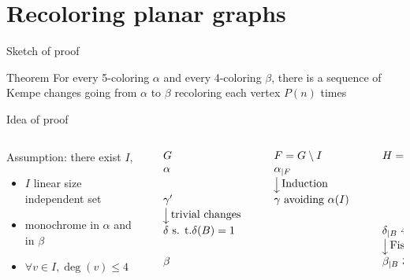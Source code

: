 \documentclass[11pt,xcolor=dvipsnames,presentation,aspectratio=169]{beamer}
\begin{document}
\section*{Recoloring planar graphs}
\begin{frame}{Sketch of proof}
  \begin{block}{Theorem}
    For every 5-coloring $\alpha$ and every 4-coloring $\beta$, there is a
    sequence of Kempe changes going from $\alpha$ to $\beta$ recoloring each
    vertex $P(n)$ times
  \end{block}

  \begin{block}{Idea of proof}
    \vspace{-.5cm}
    \begin{columns}
      \hfill
      \begin{column}{.35\textwidth}
        Assumption: there exist $I$,
        \begin{itemize}
        \item $I$ linear size independent set
        \item monochrome in $\alpha$ and in $\beta$
        \item $\forall v \in I, \deg(v) \le 4$
        \end{itemize}
        \vspace{1.5cm}
      \end{column}
      \hfill
      \begin{column}{.65\textwidth}
        $$\begin{array}{lllll}
          G && F = G \setminus I && H = G \setminus B\\
          \alpha &\quad& \alpha_{|F}&\quad& \\
          && \rotatebox[origin=c]{-90}{$\longrightarrow$} \text{ Induction} && \\
          \gamma' && \gamma \text{ avoiding } \alpha(I) &&\\
          \rotatebox[origin=c]{-90}{$\longrightarrow$} \text{ trivial changes}&& && \\
          \delta \text{ s. t.} \delta(B) = 1 && && \delta_{|B} \text{ 4-col}\\
          && && \rotatebox[origin=c]{-90}{$\longrightarrow$} \text{ Fisk} \\
          \beta && && \beta_{|B} \text{ 3-col}\\
        \end{array}
        $$        
      \end{column}
      \hfill
    \end{columns}
  \end{block}
\end{frame}
\end{document}
